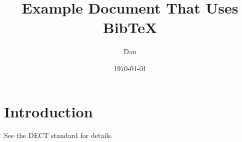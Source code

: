 \documentclass[11pt]{article}
\title{Example Document That Uses BibTeX}
\author{Dan}
\date{\today}
\begin{document}
\maketitle
\section{Introduction}
See the DECT standard\cite{en300.175-2v1.4.2} for details.



\end{document}
